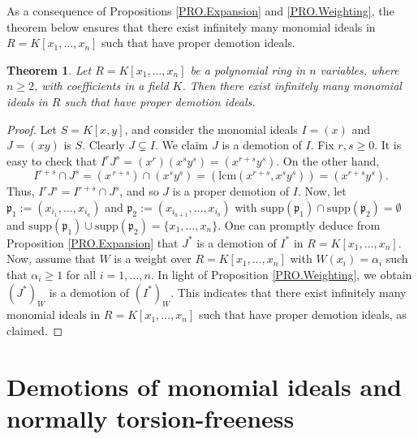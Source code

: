 \documentclass[11pt]{amsart}
\newtheorem{theorem}{Theorem}[section]
\begin{document}

As a consequence of  Propositions \ref{PRO.Expansion} and \ref{PRO.Weighting}, the theorem below ensures that there exist infinitely many monomial ideals in 
 $R=K[x_1, \ldots, x_n]$  such that  have  proper demotion ideals. 

 
\begin{theorem} \label{Th.Infinite}
Let $R=K[x_1, \ldots, x_n]$ be  a polynomial ring in $n$  variables, where $n\geq 2$,  with coefficients in a  field $K$. Then 
there exist infinitely many  monomial ideals  in $R$ such that  have  proper demotion ideals. 
\end{theorem}


\begin{proof}
Let $S=K[x,y]$, and consider the monomial  ideals $I=(x)$ and $J=(xy)$ is $S$. Clearly $J \subsetneq I$. We claim   $J$ is a demotion of $I$. Fix $r,s\geq 0$. It is easy to check that  $I^rJ^s=(x^r)(x^sy^s)=(x^{r+s}y^s).$  On the other hand,
$$I^{r+s}\cap J^s=(x^{\,r+s})\cap (x^sy^s)= (\mathrm{lcm}(x^{r+s},x^sy^s))=(x^{r+s}y^s).$$
Thus, $I^rJ^s = I^{r+s}\cap J^s$, and so   $J$ is a proper demotion of $I$.
 Now, let $\mathfrak{p}_1:=(x_{i_1}, \ldots, x_{i_a})$ and  $\mathfrak{p}_2:=(x_{i_{a+1}}, \ldots, x_{i_b})$  with  $\mathrm{supp}(\mathfrak{p}_1) \cap  \mathrm{supp}(\mathfrak{p}_2)=\emptyset$ and $\mathrm{supp}(\mathfrak{p}_1) \cup \mathrm{supp}(\mathfrak{p}_2)=\{x_1, \ldots, x_n\}$. 
 One can promptly deduce from  Proposition  \ref{PRO.Expansion} that $J^*$ is a demotion of $I^*$ in $R=K[x_1, \ldots, x_n]$. Now, assume that  $W$ is 
 a weight over $R=K[x_1, \ldots, x_n]$  with $W(x_i)=\alpha_i$ such that $\alpha_i \geq 1$ for all $i=1, \ldots, n$. In  light of  Proposition  \ref{PRO.Weighting}, we obtain   $(J^*)_W$ is a demotion of $(I^*)_W$. This indicates that there exist infinitely many monomial ideals in $R=K[x_1, \ldots, x_n]$  
 such that have proper demotion ideals, as claimed.  
  \end{proof}





\section{Demotions of monomial ideals and normally torsion-freeness} \label{Section 6}
\end{document}
